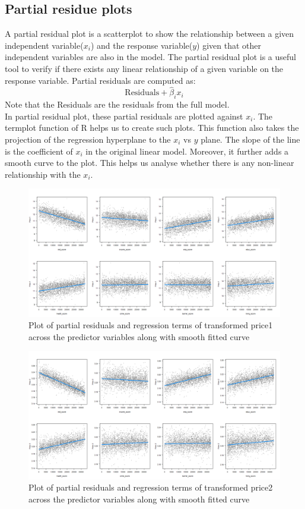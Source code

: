\documentclass[12pt]{article}
\begin{document}
\subsection{Partial residue plots}
\label{prp}
A partial residual plot is a scatterplot to show the relationship between a given independent variable($x_i$) and the response variable($y$) given that other independent variables are also in the model.
The partial residual plot is a useful tool to verify if there exists any linear relationship of a given variable on the response variable.
Partial residuals are computed as:
$$\textrm{Residuals} +{\hat {\beta }}_{i}x_{i}$$
Note that the Residuals are the residuals from the full model.\\
In partial residual plot, these partial residuals are plotted against $x_i$. The termplot function of R helps us to create such plots.
This function also takes the projection of the regression hyperplane to the $x_i$ vs $y$ plane. The slope of the line is the coefficient of $x_i$ in the original linear model.
Moreover, it further adds a smooth curve to the plot. This helps us analyse whether there is any non-linear relationship with the $x_i$.
\\
\begin{figure}[H]
    \centering
    \includegraphics[width=18cm]{4. price vs socio-eco images/par.resid_1Plot.png}
    \caption{Plot of partial residuals and regression terms of transformed \gls{price1} across the predictor variables along with smooth fitted curve}
    \label{fig:prp1}
\end{figure}
\begin{figure}[H]
    \centering
    \includegraphics[width=18cm]{4. price vs socio-eco images/par.resid_2Plot.png}
    \caption{Plot of partial residuals and regression terms of transformed \gls{price2} across the predictor variables along with smooth fitted curve}
    \label{fig:prp2}
\end{figure}
\end{document}
